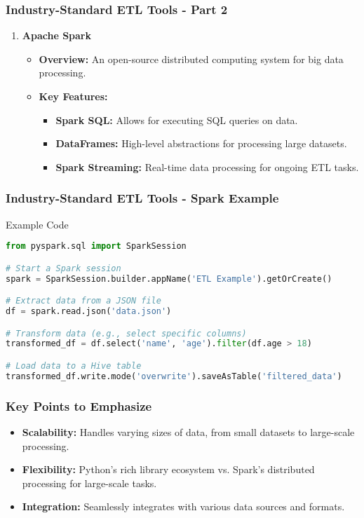 \documentclass[aspectratio=169]{beamer}
\begin{document}
\begin{frame}
    \frametitle{Industry-Standard ETL Tools - Part 2}
    \begin{enumerate}[resume]
        \item \textbf{Apache Spark}
        \begin{itemize}
            \item \textbf{Overview:} An open-source distributed computing system for big data processing.
            \item \textbf{Key Features:}
                \begin{itemize}
                    \item \textbf{Spark SQL:} Allows for executing SQL queries on data.
                    \item \textbf{DataFrames:} High-level abstractions for processing large datasets.
                    \item \textbf{Spark Streaming:} Real-time data processing for ongoing ETL tasks.
                \end{itemize}
        \end{itemize}
    \end{enumerate}
\end{frame}

\begin{frame}[fragile]
    \frametitle{Industry-Standard ETL Tools - Spark Example}
    \begin{block}{Example Code}
    \begin{lstlisting}[language=Python]
from pyspark.sql import SparkSession

# Start a Spark session
spark = SparkSession.builder.appName('ETL Example').getOrCreate()

# Extract data from a JSON file
df = spark.read.json('data.json')

# Transform data (e.g., select specific columns)
transformed_df = df.select('name', 'age').filter(df.age > 18)

# Load data to a Hive table
transformed_df.write.mode('overwrite').saveAsTable('filtered_data')
    \end{lstlisting}
    \end{block}
\end{frame}

\begin{frame}
    \frametitle{Key Points to Emphasize}
    \begin{itemize}
        \item \textbf{Scalability:} Handles varying sizes of data, from small datasets to large-scale processing.
        \item \textbf{Flexibility:} Python's rich library ecosystem vs. Spark's distributed processing for large-scale tasks.
        \item \textbf{Integration:} Seamlessly integrates with various data sources and formats.
    \end{itemize}
\end{frame}
\end{document}
